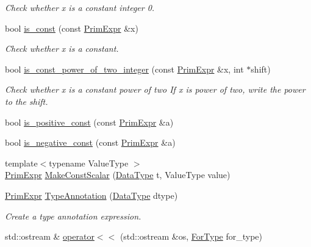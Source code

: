 \begin{DoxyCompactItemize}
\begin{DoxyCompactList}\small\item\em Check whether x is a constant integer 0. \end{DoxyCompactList}\item 
bool \hyperlink{namespacetvm_1_1tir_ab706ef9860459b25068f3440d88a7193}{is\+\_\+const} (const \hyperlink{classtvm_1_1PrimExpr}{Prim\+Expr} \&x)
\begin{DoxyCompactList}\small\item\em Check whether x is a constant. \end{DoxyCompactList}\item 
bool \hyperlink{namespacetvm_1_1tir_a246623a4a0c9cd8f8a209ec952a8d1c3}{is\+\_\+const\+\_\+power\+\_\+of\+\_\+two\+\_\+integer} (const \hyperlink{classtvm_1_1PrimExpr}{Prim\+Expr} \&x, int $\ast$shift)
\begin{DoxyCompactList}\small\item\em Check whether x is a constant power of two If x is power of two, write the power to the shift. \end{DoxyCompactList}\item 
bool \hyperlink{namespacetvm_1_1tir_a782dc226f8b2b537efdc56b1f76351d1}{is\+\_\+positive\+\_\+const} (const \hyperlink{classtvm_1_1PrimExpr}{Prim\+Expr} \&a)
\item 
bool \hyperlink{namespacetvm_1_1tir_a51d552441331effb387b7c8fb241c454}{is\+\_\+negative\+\_\+const} (const \hyperlink{classtvm_1_1PrimExpr}{Prim\+Expr} \&a)
\item 
{\footnotesize template$<$typename Value\+Type $>$ }\\\hyperlink{classtvm_1_1PrimExpr}{Prim\+Expr} \hyperlink{namespacetvm_1_1tir_af2ca71170aca9d397c2125eb4f55c197}{Make\+Const\+Scalar} (\hyperlink{namespacetvm_a41918af1a1dc386388639a9d3ad06c5d}{Data\+Type} t, Value\+Type value)
\item 
\hyperlink{classtvm_1_1PrimExpr}{Prim\+Expr} \hyperlink{namespacetvm_1_1tir_afb1743e78389c4beaf0b788c631d424e}{Type\+Annotation} (\hyperlink{namespacetvm_a41918af1a1dc386388639a9d3ad06c5d}{Data\+Type} dtype)
\begin{DoxyCompactList}\small\item\em Create a type annotation expression. \end{DoxyCompactList}\item 
std\+::ostream \& \hyperlink{namespacetvm_1_1tir_a12a98cd1a8440b18d6bac0ad3eaa42ed}{operator$<$$<$} (std\+::ostream \&os, \hyperlink{namespacetvm_1_1tir_ae35cce8e3f1e8d7366dc0d9b15536736}{For\+Type} for\+\_\+type)

\end{DoxyCompactItemize}
